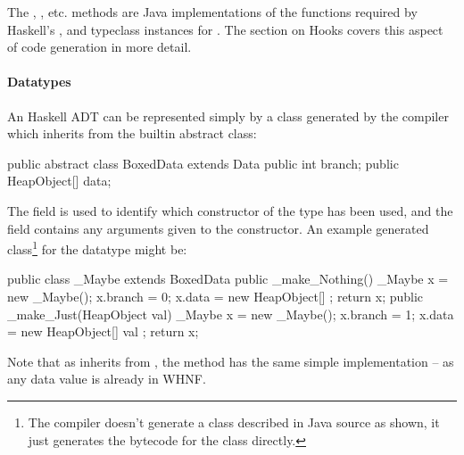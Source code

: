 \documentclass[dissertation.tex]{subfiles}
\begin{document}
{{{{                The , , etc. methods are Java implementations of the functions required by Haskell's
                ,  and  typeclass instances for . The section on
                Hooks covers this aspect of code generation in more detail.

            }
            \paragraph*{Datatypes}
            {
                
                An Haskell ADT can be represented simply by a class generated by the compiler which inherits from the
                 builtin abstract class:

                \begin{javafigure}
                public abstract class BoxedData extends Data {
                    public int branch;
                    public HeapObject[] data;
                }
                \end{javafigure}

                The  field is used to identify which constructor of the type has been used, and the
                 field contains any arguments given to the constructor. An example generated
                class\footnote{The compiler doesn't generate a class described in Java source as shown, it just
                generates the bytecode for the class directly.} for the datatype  might be:

                \begin{javafigure}
                public class _Maybe extends BoxedData {
                    public _make_Nothing() {
                        _Maybe x = new _Maybe();
                        x.branch = 0;
                        x.data = new HeapObject[] {};
                        return x;
                    }
                    public _make_Just(HeapObject val) {
                        _Maybe x = new _Maybe();
                        x.branch = 1;
                        x.data = new HeapObject[] { val };
                        return x;
                    }
                }
                \end{javafigure}

                Note that as  inherits from , the  method has the same simple
                implementation -- as any data value is already in WHNF.

}}}}
\end{document}
